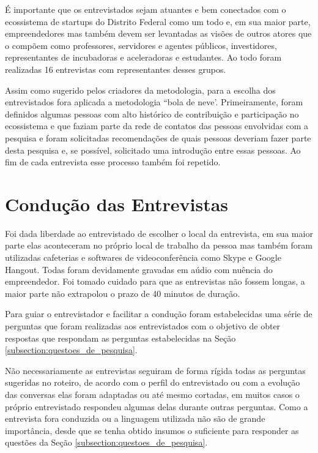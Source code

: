 É importante que os entrevistados sejam atuantes e bem conectados com o ecossistema de startups do Distrito Federal como um todo e, em sua maior parte, empreendedores mas também devem ser levantadas as visões de outros atores que o compõem como professores, servidores e agentes públicos, investidores, representantes de incubadoras e aceleradoras e estudantes. Ao todo foram realizadas 16 entrevistas com representantes desses grupos.

Assim como sugerido pelos criadores da metodologia, para a escolha dos entrevistados fora aplicada a metodologia ``bola de neve'. Primeiramente, foram definidos algumas pessoas com alto histórico de contribuição e participação no ecossistema e que faziam parte da rede de contatos das pessoas envolvidas com a pesquisa e foram solicitadas recomendações de quais pessoas deveriam fazer parte desta pesquisa e, se possível, solicitado uma introdução entre essas pessoas. Ao fim de cada entrevista esse processo também foi repetido.

\section{Condução das Entrevistas}
\label{subsection:conducao_das_entrevistas}

Foi dada liberdade ao entrevistado de escolher o local da entrevista, em sua maior parte elas aconteceram no próprio local de trabalho da pessoa mas também foram utilizadas cafeterias e softwares de videoconferência como Skype e Google Hangout. Todas foram devidamente gravadas em aúdio com nuência do empreendedor. Foi tomado cuidado para que as entrevistas não fossem longas, a maior parte não extrapolou o prazo de 40 minutos de duração. 

Para guiar o entrevistador e facilitar a condução foram estabelecidas uma série de perguntas que foram realizadas aos entrevistados com o objetivo de obter respostas que respondam as perguntas estabelecidas na Seção \ref{subsection:questoes_de_pesquisa}.

Não necessariamente as entrevistas seguiram de forma rígida todas as perguntas sugeridas no roteiro, de acordo com o perfil do entrevistado ou com a evolução das conversas elas foram adaptadas ou até mesmo cortadas, em muitos casos o próprio entrevistado respondeu algumas delas durante outras perguntas. Como a entrevista fora conduzida ou a linguagem utilizada não são de grande importância, desde que se tenha obtido insumos o suficiente para responder as questões da Seção \ref{subsection:questoes_de_pesquisa}.

